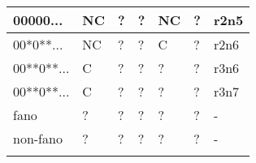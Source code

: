 \begin{center}
\begin{tabular}{ | l | l | l | l | l | l |p{2.5cm} |}
     00000... & NC &  ? & ? & NC & ? & r2n5 \\ \hline
     00*0**... & NC &  ? & ? & C & ? & r2n6 \\ \hline
     00**0**...& C &  ? & ? & ? & ? & r3n6 \\ \hline
     00**0**...& C &  ? & ? & ? & ? & r3n7 \\ \hline
    fano &  ? & ? & ? & ? & ? & - \\ \hline
    non-fano &  ? & ? & ? & ? & ? & - \\ \hline
    \label{Tab:computational-results}
    \end{tabular}
\end{center}




 
